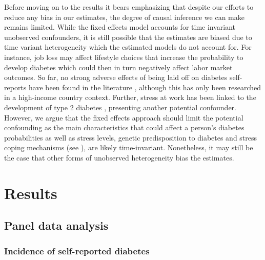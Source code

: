 \documentclass[12pt,english,british]{article}
\begin{document}
Before moving on to the results it bears emphasizing that despite our efforts to reduce any bias in our estimates, the degree of causal inference we can make remains limited. While the fixed effects model accounts for time invariant
unobserved confounders, it is still possible that the estimates are biased
due to time variant heterogeneity which the estimated models do not account for. For instance, job loss may affect lifestyle choices that increase the probability to develop
diabetes which could then in turn negatively affect labor market outcomes. So far, no strong adverse effects of being laid
off on diabetes self-reports have been found in the literature \citep{Bergemann2011,Schaller2015},
although this has only been researched in a high-income country context.  Further, stress at work has been linked to the development of type 2 diabetes \citep{Heraclides2012,Eriksson2013}, presenting another potential confounder. However, we argue that the fixed effects approach should limit the potential confounding as the main characteristics that could affect a person's diabetes probabilities as well as stress levels, genetic predisposition to diabetes and stress coping mechanisms (see \citet{Schneiderman2005}), are likely time-invariant. Nonetheless, it may still be the case that other forms of unobserved heterogeneity bias the estimates.


\section{\label{sec:RESULTS} Results}


\subsection{Panel data analysis}

\subsubsection{Incidence of self-reported diabetes}
\end{document}
